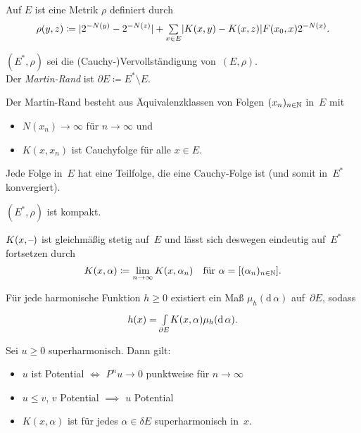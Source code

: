 \documentclass{cheat-sheet}
\begin{document}
\begin{defn}
  Auf $E$ ist eine Metrik $\rho$ definiert durch
  \[
    \rho(y, z) \coloneqq \abs{2^{-N(y)} - 2^{-N(z)}} + \sum_{x \in E} \abs{K(x, y) - K(x, z)} F(x_0, x) 2^{-N(x)}.
  \]
\end{defn}

\begin{defn}
  \begin{minipage}[t]{0.85 \linewidth}
    $(E^*, \rho)$ sei die (Cauchy-)Vervollständigung von~$(E, \rho)$. \\
    Der \emph{Martin-Rand} ist $\partial E \coloneqq E^* \setminus E$.
  \end{minipage}
\end{defn}

\begin{bem}
  Der Martin-Rand besteht aus Äquivalenzklassen von Folgen $(x_n)_{n \in \mathbb{N}}$ in~$E$ mit
  \begin{itemize}
    \item $N(x_n) \to \infty$ für $n \to \infty$ und
    \item $K(x, x_n)$ ist Cauchyfolge für alle $x \in E$.
  \end{itemize}
\end{bem}

\begin{lem}
  Jede Folge in~$E$ hat eine Teilfolge, die eine Cauchy-Folge ist (und somit in~$E^*$ konvergiert).
\end{lem}

\begin{kor}
  $(E^*, \rho)$ ist kompakt.
\end{kor}

\begin{lemdefn}
  $K(x, \text{--})$ ist gleichmäßig stetig auf~$E$ und lässt sich deswegen eindeutig auf~$E^*$ fortsetzen durch
  \[
    K(x, \alpha) \coloneqq \lim_{n \to \infty} K(x, \alpha_n) \quad
    \text{für } \alpha = [(\alpha_n)_{n \in \mathbb{N}}].
  \]
\end{lemdefn}

\begin{satz}
  Für jede harmonische Funktion $h \geq 0$ existiert ein Maß $\mu_h(\mathrm{d}\,\alpha)$ auf~$\partial E$, sodass
  \[
    h(x) = {\textstyle \int\limits_{\partial E}^{}} K(x, \alpha) \mu_h(\mathrm{d}\,\alpha).
  \]
\end{satz}

\begin{lem}
  Sei $u \geq 0$ superharmonisch.
  Dann gilt:
  \begin{itemize}
    \item $u$ ist Potential $\iff$ $P^n u \to 0$ punktweise für $n \to \infty$
    \item $u \leq v$, $v$ Potential $\implies$ $u$ Potential
    \item $K(x, \alpha)$ ist für jedes $\alpha \in \delta E$ superharmonisch in~$x$.
  \end{itemize}
\end{lem}
\end{document}
